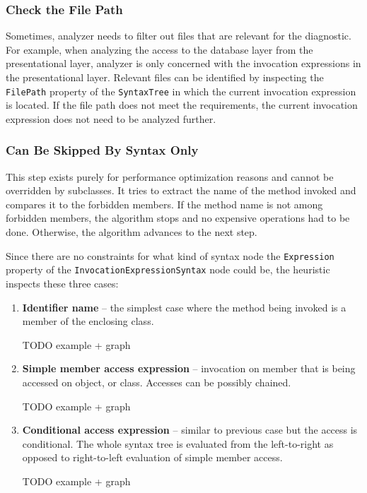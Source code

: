 \documentclass[
  digital, %
  table,   %
  lof,     %
  lot,     %
  oneside,
]{fithesis3}
\begin{document}
\subsubsection{Check the File Path}
Sometimes, analyzer needs to filter out files that are relevant for the diagnostic. For example, when analyzing the access to the database layer from the presentational layer, analyzer is only concerned with the invocation expressions in the presentational layer. Relevant files can be identified by inspecting the \texttt{FilePath} property of the \texttt{SyntaxTree} in which the current invocation expression is located. If the file path does not meet the requirements, the current invocation expression does not need to be analyzed further.

\subsubsection{Can Be Skipped By Syntax Only}
This step exists purely for performance optimization reasons and cannot be overridden by subclasses. It tries to extract the name of the method invoked and compares it to the forbidden members. If the method name is not among forbidden members, the algorithm stops and no expensive operations had to be done. Otherwise, the algorithm advances to the next step.

Since there are no constraints for what kind of syntax node the \texttt{Expression} property of the \texttt{InvocationExpressionSyntax} node could be, the heuristic inspects these three cases:
\begin{enumerate}
  \item \textbf{Identifier name} -- the simplest case where the method being invoked is a member of the enclosing class.

  TODO example + graph
  
  \item \textbf{Simple member access expression} -- invocation on member that is being accessed on object, or class. Accesses can be possibly chained.
  
  TODO example + graph
    
  \item \textbf{Conditional access expression} -- similar to previous case but the access is conditional. The whole syntax tree is evaluated from the left-to-right as opposed to right-to-left evaluation of simple member access.  
  
  TODO example + graph
  
\end{enumerate} 
\end{document}
